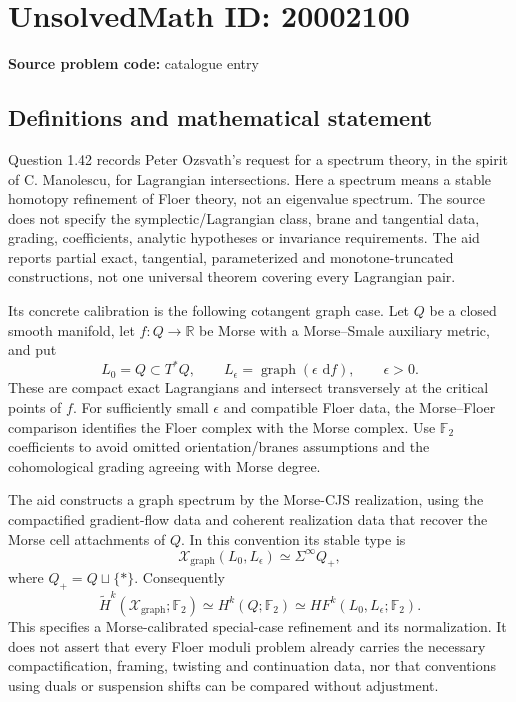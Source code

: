 \documentclass[11pt]{article}
\newcommand{\R}{\mathbb{R}}
\newcommand{\F}{\mathbb{F}}
\newcommand{\dd}{\,\mathrm{d}}
\begin{document}
\section*{UnsolvedMath ID: 20002100}
\textbf{Source problem code:} catalogue entry
\subsection{Definitions and mathematical statement}
Question 1.42 records Peter Ozsvath's request for a spectrum theory, in the spirit of C. Manolescu, for Lagrangian intersections. Here a spectrum means a stable homotopy refinement of Floer theory, not an eigenvalue spectrum. The source does not specify the symplectic/Lagrangian class, brane and tangential data, grading, coefficients, analytic hypotheses or invariance requirements. The aid reports partial exact, tangential, parameterized and monotone-truncated constructions, not one universal theorem covering every Lagrangian pair.

Its concrete calibration is the following cotangent graph case. Let \(Q\) be a closed smooth manifold, let \(f:Q\to\R\) be Morse with a Morse--Smale auxiliary metric, and put
\[
 L_0=Q\subset T^*Q,\qquad
 L_\epsilon=\operatorname{graph}(\epsilon\,\dd f),\qquad\epsilon>0.
\]
These are compact exact Lagrangians and intersect transversely at the critical points of \(f\). For sufficiently small \(\epsilon\) and compatible Floer data, the Morse--Floer comparison identifies the Floer complex with the Morse complex. Use \(\F_2\) coefficients to avoid omitted orientation/branes assumptions and the cohomological grading agreeing with Morse degree.

The aid constructs a graph spectrum by the Morse-CJS realization, using the compactified gradient-flow data and coherent realization data that recover the Morse cell attachments of \(Q\). In this convention its stable type is
\[
 \mathcal X_{\mathrm{graph}}(L_0,L_\epsilon)
 \simeq\Sigma^\infty Q_+,
\]
where \(Q_+=Q\sqcup\{*\}\). Consequently
\[
 \widetilde H^k(\mathcal X_{\mathrm{graph}};\F_2)
 \simeq H^k(Q;\F_2)
 \simeq HF^k(L_0,L_\epsilon;\F_2).
\]
This specifies a Morse-calibrated special-case refinement and its normalization. It does not assert that every Floer moduli problem already carries the necessary compactification, framing, twisting and continuation data, nor that conventions using duals or suspension shifts can be compared without adjustment.
\end{document}
